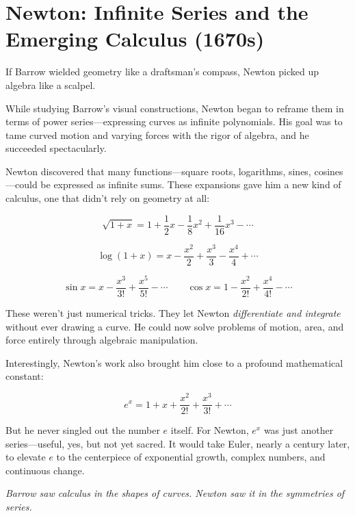 \section{Newton: Infinite Series and the Emerging Calculus (1670s)}

If Barrow wielded geometry like a draftsman’s compass, Newton picked up algebra like a scalpel.

While studying Barrow’s visual constructions, Newton began to reframe them in terms of power series—expressing curves as infinite polynomials. His goal was to tame curved motion and varying forces with the rigor of algebra, and he succeeded spectacularly.

Newton discovered that many functions—square roots, logarithms, sines, cosines—could be expressed as infinite sums. These expansions gave him a new kind of calculus, one that didn't rely on geometry at all:

\[
\sqrt{1 + x} = 1 + \frac{1}{2}x - \frac{1}{8}x^2 + \frac{1}{16}x^3 - \cdots
\]

\[
\log(1 + x) = x - \frac{x^2}{2} + \frac{x^3}{3} - \frac{x^4}{4} + \cdots
\]

\[
\sin x = x - \frac{x^3}{3!} + \frac{x^5}{5!} - \cdots \qquad \cos x = 1 - \frac{x^2}{2!} + \frac{x^4}{4!} - \cdots
\]

These weren’t just numerical tricks. They let Newton \textit{differentiate and integrate} without ever drawing a curve. He could now solve problems of motion, area, and force entirely through algebraic manipulation.

\vspace{1em}

Interestingly, Newton’s work also brought him close to a profound mathematical constant:

\[
e^x = 1 + x + \frac{x^2}{2!} + \frac{x^3}{3!} + \cdots
\]

But he never singled out the number \( e \) itself. For Newton, \( e^x \) was just another series—useful, yes, but not yet sacred. It would take Euler, nearly a century later, to elevate \( e \) to the centerpiece of exponential growth, complex numbers, and continuous change.

\vspace{1em}

\begin{center}
\textit{Barrow saw calculus in the shapes of curves. Newton saw it in the symmetries of series.}
\end{center}
